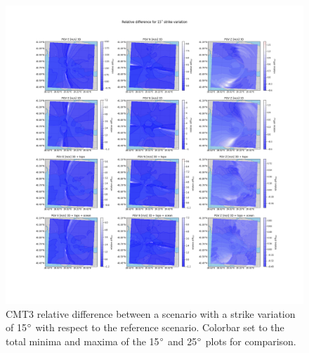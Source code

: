 \documentclass[../Text/00main.tex]{subfiles}
\begin{document}
\begin{figure}[!h]
    \centering
    \includegraphics[width=1.2\linewidth]{images_results/strike_variation_epsilon12_sc3.png}
    \caption{CMT3 relative difference between a scenario with a strike variation of 15$\degree$ with respect to the reference scenario. Colorbar set to the total minima and maxima of the 15$\degree$ and 25$\degree$ plots for comparison.}
    \label{fig:ref_eps12-2}
\end{figure}
\end{document}
